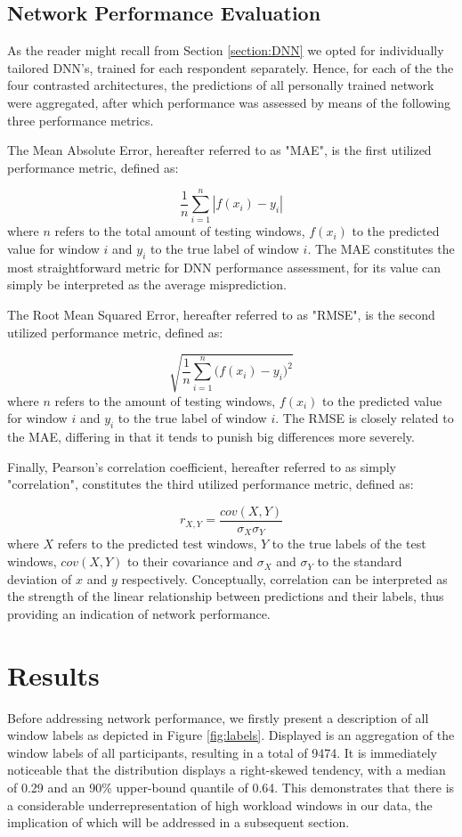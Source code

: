 \documentclass[fleqn,11pt]{paper}
\begin{document}
\subsection{Network Performance Evaluation}
As the reader might recall from Section \ref{section:DNN} we opted for individually tailored DNN's, trained for each respondent separately. Hence, for each of the the four contrasted architectures, the predictions of all personally trained network were aggregated, after which performance was assessed by means of the following three performance metrics. 

The Mean Absolute Error, hereafter referred to as "MAE",  is the first utilized performance metric, defined as:

$$\frac{1}{n} \sum^n_{i=1}|f(x_i)-y_i|$$
where $n$ refers to the total amount of testing windows, $f(x_i)$ to the predicted value for window $i$ and $y_i$ to the true label of window $i$.
The MAE constitutes the most straightforward metric for DNN performance assessment, for its value can simply be interpreted as the average misprediction. 

The Root Mean Squared Error, hereafter referred to as "RMSE", is the second utilized performance metric, defined as:

$$\sqrt{{\frac{1}{n} \sum^n_{i=1} \Big( f(x_i)-y_i} \Big) ^2}$$
where $n$ refers to the amount of testing windows, $f(x_i)$ to the predicted value for window $i$ and $y_i$ to the true label of window $i$. The RMSE is closely related to the MAE, differing in that it tends to punish big differences more severely. 

Finally, Pearson's correlation coefficient, hereafter referred to as simply "correlation", constitutes the third utilized performance metric, defined as:

$$r_{X,Y} = \frac{cov(X,Y)}{\sigma_{X} \sigma_{Y}}$$
where $X$ refers to the predicted test windows,  $Y$ to the true labels of the test windows, $cov(X,Y)$ to their covariance and $\sigma_{X}$ and $\sigma_{Y}$ to the standard deviation of $x$ and $y$ respectively.  Conceptually, correlation can be interpreted as the strength of the linear relationship between predictions and their labels, thus providing an indication of network performance. 

\vspace{8mm}
\section{Results}
Before addressing network performance, we firstly present a description of all window labels as depicted in Figure \ref{fig:labels}. Displayed is an aggregation of the window labels of all participants, resulting in a total of 9474. It is immediately noticeable that the distribution displays a right-skewed tendency, with a median of 0.29 and an 90\% upper-bound quantile of 0.64. This demonstrates that there is a considerable underrepresentation of high workload windows in our data, the implication of which will be addressed in a subsequent section. 
\end{document}
